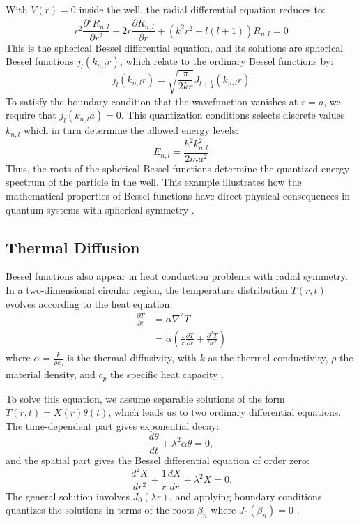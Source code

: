 \documentclass[linenumbers, twocolumn]{aastex631}
\begin{document}
\noindent With $V(r)=0$ inside the well, the radial differential equation
reduces to:
\begin{equation}
    r^2\frac{\partial^2 R_{n,l}}{\partial r^2} + 2r\frac{\partial R_{n,l}}{\partial r} +(k^2r^2-l(l+1))R_{n,l}=0
\end{equation}
\noindent This is the spherical Bessel differential equation, and its solutions
are spherical Bessel functions $j_l(k_{n,l}r)$, which relate to the ordinary
Bessel functions by:
\begin{equation}
    j_l(k_{n,l}r)=\sqrt{\frac{\pi}{2kr}}J_{l+\frac{1}{2}}(k_{n,l}r)
\end{equation}
\noindent To satisfy the boundary condition that the wavefunction vanishes at
$r=a$, we require that $j_l(k_{n,l}a)=0$. This quantization conditions selects
discrete values $k_{n,l}$ which in turn determine the allowed energy levels:
\begin{equation}
    E_{n,l}=\frac{\hbar^2k_{n,l}^2}{2ma^2}
\end{equation}
\noindent Thus, the roots of the spherical Bessel functions determine the
quantized energy spectrum of the particle in the well. This example illustrates how
the mathematical properties of Bessel functions have direct physical 
consequences in quantum systems with spherical symmetry \cite{weisstein}.\\


\subsection{Thermal Diffusion}

Bessel functions also appear in heat conduction problems with radial symmetry.
In a two-dimensional circular region, the temperature distribution $T(r,t)$
evolves according to the heat equation:
\begin{align}
    \frac{\partial T}{\partial t}&=\alpha\nabla^2T\\
    &=\alpha\left(\frac{1}{r} \frac{\partial T}{\partial r} + \frac{\partial^2 T}{\partial r^2}\right)
\end{align}
\noindent where  $\alpha=\frac{k}{\rho c_p}$ is the thermal diffusivity, with
$k$ as the thermal conductivity, $\rho$ the material density, and $c_p$ the
specific heat capacity \cite{hahn}.

\noindent To solve this equation, we assume separable solutions of the form
$T(r,t)=X(r)\theta(t)$, which leads us to two ordinary differential equations.
The time-dependent part gives exponential decay:
\begin{equation}
    \frac{d\theta}{dt}+\lambda^2\alpha\theta=0,
\end{equation}
\noindent and the spatial part gives the Bessel differential equation
of order zero:
\begin{equation}
    \frac{d^2X}{dr^2}+\frac{1}{r}\frac{dX}{dr}+\lambda^2X=0.
\end{equation}
\noindent The general solution involves $J_0(\lambda r)$, and applying boundary
conditions quantizes the solutions in terms of the roots $\beta_n$ where
$J_0(\beta_n)=0$ \cite{tsega}.
\end{document}
